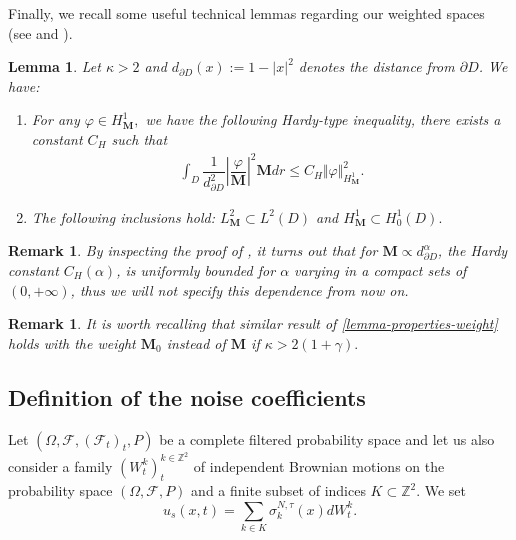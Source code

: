 \documentclass[a4paper,12pt, reqno]{amsart}
\newtheorem{lemma}[theorem]{Lemma}
\newtheorem{remark}[theorem]{Remark}
\newcommand{\M}{\mathbf{M}}
\begin{document}
Finally, we recall some useful technical lemmas regarding our weighted spaces (see \cite[Subsection 2.3.]{Chupin2010fokker} and \cite[Remark 3.7]{Masmoudi2008}).
\begin{lemma} \label{lemma-properties-weight}
Let $\kappa> 2$ and $d_{\partial D}(x) := 1-|x|^2$ denotes the distance from $\partial D$.  We have:
    \begin{enumerate}
       \item For any $\varphi\in H^1_\mathbf{M}, $ we have the following Hardy-type inequality, there exists a constant $C_H$ such that
     \begin{align}\label{Hardy-ineq}
          \int_D \dfrac{1}{d_{\partial D}^2}\left\vert\dfrac{\varphi}{\mathbf{M}}\right\vert^2 \mathbf{M}dr \le C_H \Vert \varphi\Vert^2_{H^1_\mathbf{M}}.
       \end{align}
        \item The following inclusions hold: $L^2_\mathbf{M} \subset L^2(D)$ and $H^1_\mathbf{M}\subset H^1_0(D).$
     \end{enumerate}
\end{lemma}
\begin{remark}\label{rem:hardy-constant}
    By inspecting the proof of \cite[Lemma 2.3]{Chupin2010fokker}, it turns out that for $\M \propto d_{\partial D}^\alpha$, the Hardy constant $C_H(\alpha)$, is uniformly bounded for $\alpha$ varying in a compact sets of $(0, +\infty)$, thus we will not specify this dependence from now on. 
\end{remark}
\begin{remark}
It is worth recalling that similar result of \autoref{lemma-properties-weight} holds with the weight $\mathbf{M}_0$ instead of $\mathbf{M}$ if $\kappa> 2(1+\gamma).$ 
\end{remark} 
\subsection{Definition of the noise coefficients}\label{assumption_noise-2D}
Let $(\Omega,\mathcal{F},(\mathcal{F}_t)_t,P)$  be  a   complete   filtered probability space and let us also consider a family $(W_t^k)_t^{k\in    \mathbb{Z}^2}$ of independent Brownian motions on the probability space $(\Omega,\mathcal{F},P)$ and a finite subset of indices $K \subset \mathbb{Z}^2$.  We set $$u_s(x,t)=\sum_{k\in K}%
\sigma_{k}^{N,\tau}\left(  x\right)  dW_{t}^{k}.$$
\end{document}
